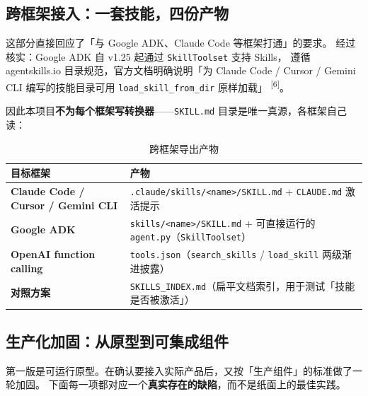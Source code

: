 \documentclass[UTF8, fontset=windows, 11pt, a4paper]{ctexart}
\begin{document}
\subsection{跨框架接入：一套技能，四份产物}

这部分直接回应了「与 Google ADK、Claude Code 等框架打通」的要求。
经过核实：Google ADK 自 v1.25 起通过 \texttt{SkillToolset} 支持 Skills，
遵循 agentskills.io 目录规范，官方文档明确说明「为 Claude Code / Cursor / Gemini CLI
编写的技能目录可用 \texttt{load\_skill\_from\_dir} 原样加载」
\textsuperscript{[6]}。

因此本项目\textbf{不为每个框架写转换器}——\texttt{SKILL.md} 目录是唯一真源，各框架自己读：

\begin{table}[h]
\centering
\small
\begin{tabularx}{\textwidth}{@{}>{\bfseries}p{4.3cm} >{\raggedright\arraybackslash}X@{}}
\toprule
目标框架 & 产物 \\
\midrule
Claude Code / Cursor / Gemini CLI & \texttt{.claude/skills/<name>/SKILL.md} + \texttt{CLAUDE.md} 激活提示 \\
Google ADK & \texttt{skills/<name>/SKILL.md} + 可直接运行的 \texttt{agent.py}（\texttt{SkillToolset}） \\
OpenAI function calling & \texttt{tools.json}（\texttt{search\_skills} / \texttt{load\_skill} 两级渐进披露） \\
对照方案 & \texttt{SKILLS\_INDEX.md}（扁平文档索引，用于测试「技能是否被激活」） \\
\bottomrule
\end{tabularx}
\caption{跨框架导出产物}
\end{table}

\subsection{生产化加固：从原型到可集成组件}

第一版是可运行原型。在确认要接入实际产品后，又按「生产组件」的标准做了一轮加固。
下面每一项都对应一个\textbf{真实存在的缺陷}，而不是纸面上的最佳实践。
\end{document}
